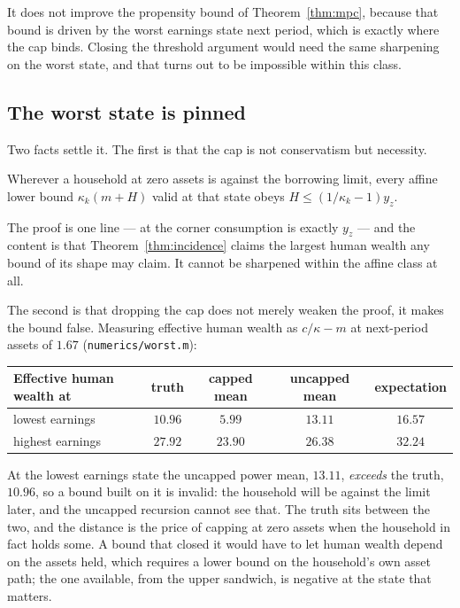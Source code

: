 It does not improve the propensity bound of Theorem~\ref{thm:mpc}, because that bound is driven by
the worst earnings state next period, which is exactly where the cap binds. Closing the threshold
argument would need the same sharpening on the worst state, and that turns out to be impossible
within this class.

\subsection{The worst state is pinned}

Two facts settle it. The first is that the cap is not conservatism but necessity.

\begin{theorem}\label{thm:cap}
Wherever a household at zero assets is against the borrowing limit, every affine lower bound
$\kappa_k(m+H)$ valid at that state obeys $H\le(1/\kappa_k-1)y_z$.
\end{theorem}

The proof is one line --- at the corner consumption is exactly $y_z$ --- and the content is that
Theorem~\ref{thm:incidence} claims the largest human wealth any bound of its shape may claim. It
cannot be sharpened within the affine class at all.

The second is that dropping the cap does not merely weaken the proof, it makes the bound false.
Measuring effective human wealth as $c/\kappa-m$ at next-period assets of $1.67$
(\texttt{numerics/worst.m}):

\begingroup\small
\begin{center}
\begin{tabular}{@{}lcccc@{}}
\toprule
Effective human wealth at & truth & capped mean & uncapped mean & expectation\\
\midrule
lowest earnings & $10.96$ & $5.99$ & $13.11$ & $16.57$\\
highest earnings & $27.92$ & $23.90$ & $26.38$ & $32.24$\\
\bottomrule
\end{tabular}
\end{center}
\endgroup

At the lowest earnings state the uncapped power mean, $13.11$, \emph{exceeds} the truth, $10.96$,
so a bound built on it is invalid: the household will be against the limit later, and the uncapped
recursion cannot see that. The truth sits between the two, and the distance is the price of
capping at zero assets when the household in fact holds some. A bound that closed it would have to
let human wealth depend on the assets held, which requires a lower bound on the household's own
asset path; the one available, from the upper sandwich, is negative at the state that matters.

